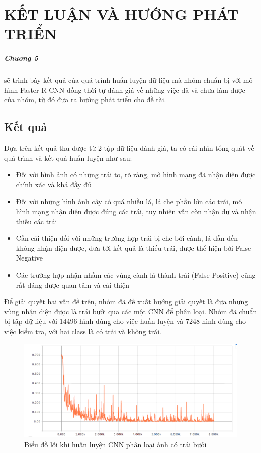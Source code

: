 \chapter{KẾT LUẬN VÀ HƯỚNG PHÁT TRIỂN}
\label{conclusion}
\paragraph{Chương 5} sẽ trình bày kết quả của quá trình huấn luyện dữ liệu mà nhóm chuẩn bị với mô hình Faster R-CNN đồng thời tự đánh giá về những việc đã và chưa làm được của nhóm, từ đó đưa ra hướng phát triển cho đề tài.

\section{Kết quả}
Dựa trên kết quả thu được từ 2 tập dữ liệu đánh giá, ta có cái nhìn tổng quát về quá trình và kết quả huấn luyện như sau:
\begin{itemize}
	\item Đối với hình ảnh có những trái to, rõ ràng, mô hình mạng đã nhận diện được chính xác và khá đầy đủ
	\item Đối với những hình ảnh cây có quá nhiều lá, lá che phần lớn các trái, mô hình mạng nhận diện được đúng các trái, tuy nhiên vẫn còn nhận dư và nhận thiếu các trái
	\item Cần cải thiện đối với những trường hợp trái bị che bởi cành, lá dẫn đến không nhận diện được, đưa tới kết quả là thiếu trái, được thể hiện bởi False Negative
	\item Các trường hợp nhận nhầm các vùng cành lá thành trái (False Positive) cũng rất đáng được quan tâm và cải thiện
\end{itemize}
Để giải quyết hai vấn đề trên, nhóm đã đề xuất hướng giải quyết là đưa những vùng nhận diện được là trái bưởi qua các một CNN để phân loại.
Nhóm đã chuẩn bị tập dữ liệu với 14496 hình dùng cho việc huấn luyện và 7248 hình dùng cho việc kiểm tra, với hai class là có trái và không trái.
\begin{center}
    \begin{figure}[H]
    \centering
    \includegraphics[width=0.7\columnwidth]{images/chap3/loss_cls_full.png}
    \caption{Biểu đồ lỗi khi huấn luyện CNN phân loại ảnh có trái bưởi}
    \label{fig:my_label}
    \end{figure}
\end{center}
